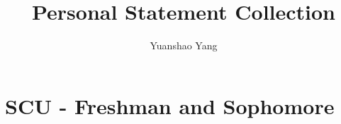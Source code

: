 \documentclass[12pt]{article}
\title{Personal Statement Collection}
\author{Yuanshao Yang}
\date{}
\begin{document}
\maketitle

\section{SCU - Freshman and Sophomore}





\end{document}
